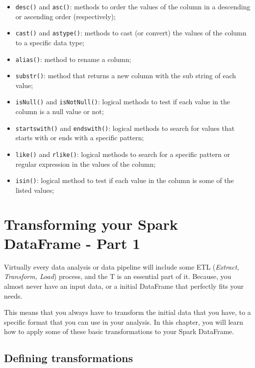 \documentclass[
  11pt,
  letterpaper,
  DIV=11,
  numbers=noendperiod]{scrreprt}
\providecommand{\tightlist}{%
  \setlength{\itemsep}{0pt}\setlength{\parskip}{0pt}}\usepackage{longtable,booktabs,array}
\begin{document}
\begin{itemize}
\tightlist
\item
  \texttt{desc()} and \texttt{asc()}: methods to order the values of the
  column in a descending or ascending order (respectively);
\item
  \texttt{cast()} and \texttt{astype()}: methods to cast (or convert)
  the values of the column to a specific data type;
\item
  \texttt{alias()}: method to rename a column;
\item
  \texttt{substr()}: method that returns a new column with the sub
  string of each value;
\item
  \texttt{isNull()} and \texttt{isNotNull()}: logical methods to test if
  each value in the column is a null value or not;
\item
  \texttt{startswith()} and \texttt{endswith()}: logical methods to
  search for values that starts with or ends with a specific pattern;
\item
  \texttt{like()} and \texttt{rlike()}: logical methods to search for a
  specific pattern or regular expression in the values of the column;
\item
  \texttt{isin()}: logical method to test if each value in the column is
  some of the listed values;
\end{itemize}


\chapter{Transforming your Spark DataFrame - Part
1}\label{sec-transforming-dataframes-part1}

Virtually every data analysis or data pipeline will include some ETL
(\emph{Extract, Transform, Load}) process, and the T is an essential
part of it. Because, you almost never have an input data, or a initial
DataFrame that perfectly fits your needs.

This means that you always have to transform the initial data that you
have, to a specific format that you can use in your analysis. In this
chapter, you will learn how to apply some of these basic transformations
to your Spark DataFrame.

\section{Defining
transformations}\label{sec-df-defining-transformations}
\end{document}
